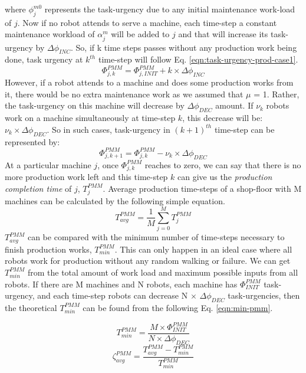 \documentclass[smallcondensed]{svjour3}
\begin{document}
where $\phi_{j}^{m0}$ represents the task-urgency due to any initial maintenance work-load of $j$.
Now if no robot attends to serve a machine, each time-step a constant maintenance workload of $\alpha_{j}^{m}$ will be added to $j$ and that will increase its task-urgency by $\Delta \phi_{INC}$. So, if k time steps passes without any production work being done, task urgency at $k^{th}$ time-step will follow Eq. \ref{eqn:task-urgency-prod-case1}.
\begin{equation}
\Phi_{j, k}^{PMM} =\Phi_{j, INIT}^{PMM} + k \times \Delta \phi_{INC}
\label{eqn:task-urgency-prod-case1}
\end{equation}
However, if a robot attends to a machine and does some production works from it, there would be no extra maintenance work as we assumed that $\mu$ = 1. Rather, the task-urgency on this machine will decrease by $\Delta \phi_{DEC}$ amount. If $\nu_{k}$ robots work on a machine simultaneously at time-step $k$, this decrease will be: $\nu_{k} \times \Delta \phi_{DEC}$. So in such cases, task-urgency in $(k+1)^{th}$ time-step can be represented by:
\begin{equation}
\Phi_{j, k+1}^{PMM} = \Phi_{j, k}^{PMM} - \nu_{k} \times \Delta \phi_{DEC}
\label{eqn:task-urgency-prod-case2}
\end{equation}
At a particular machine $j$, once $\Phi_{j, k}^{PMM}$ reaches to zero, we can say that there is no more production work left and this time-step $k$ can give us the {\em production completion time} of $j$, $T_{j}^{PMM}$. Average production time-steps of a shop-floor with M machines can be calculated by the following simple equation.
\begin{equation}
T_{avg}^{PMM} = \frac{1}{M} \sum_{j=0}^{M} T_{j}^{PMM} 
\label{eqn:avg-pmm}
\end{equation}
$T_{avg}^{PMM}$ can be compared with the minimum number of time-steps necessary to finish production works, $T_{min}^{PMM}$. This can only happen in an ideal case where all robots work for production without any random walking or failure. We can get $T_{min}^{PMM}$ from the total amount of work load and maximum possible inputs from all robots. If there are M machines and N robots, each machine has $\Phi_{INIT}^{PMM}$ task-urgency, and each time-step robots can decrease N $\times$ $\Delta \phi_{DEC}$ task-urgencies, then the theoretical $T_{min}^{PMM}$ can be found from the following Eq. \ref{eqn:min-pmm}.
%
\begin{multicols}{2}
\small
\begin{equation}
T_{min}^{PMM} = \frac{M \times \Phi_{INIT}^{PMM}}{N \times \Delta \phi_{DEC}} 
\label{eqn:min-pmm}
\end{equation}
\vspace*{0.2cm}
\begin{equation}
\zeta_{avg}^{PMM} = \frac{T_{avg}^{PMM} - T_{min}^{PMM}}{T_{min}^{PMM}} 
\label{eqn:appd}
\end{equation}
\end{multicols}
\end{document}
